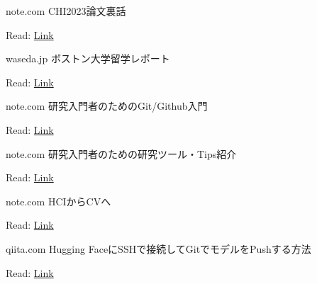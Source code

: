 
\begin{cventries}

  \cventry
    {note.com}
    {{\jpfont CHI2023論文裏話}}
    {}
    {}
    {
      \begin{cvitems}
        \item {Read: \href{https://note.com/chestnutforest/n/n03441edf8ad0}{Link}}
      \end{cvitems}
    }

  \cventry
    {waseda.jp}
    {{\jpfont ボストン大学留学レポート}}
    {}
    {}
    {
      \begin{cvitems}
        \item {Read: \href{https://www.waseda.jp/fsci/ict-robotics/study-abroad/4716}{Link}}
      \end{cvitems}
    }

  \cventry
    {note.com}
    {{\jpfont 研究入門者のためのGit/Github入門}}
    {}
    {}
    {
      \begin{cvitems}
        \item {Read: \href{https://note.com/chestnutforest/n/n2434abb8d009}{Link}}
      \end{cvitems}
    }

  \cventry
    {note.com}
    {{\jpfont 研究入門者のための研究ツール・Tips紹介}}
    {}
    {}
    {
      \begin{cvitems}
        \item {Read: \href{https://note.com/chestnutforest/n/n3ad54b1aa5f8}{Link}}
      \end{cvitems}
    }

  \cventry
    {note.com}
    {{\jpfont HCIからCVへ}}
    {}
    {}
    {
      \begin{cvitems}
        \item {Read: \href{https://note.com/chestnutforest/n/nafb01d21a878}{Link}}
      \end{cvitems}
    }

  \cventry
    {qiita.com}
    {{\jpfont Hugging FaceにSSHで接続してGitでモデルをPushする方法}}
    {}
    {}
    {
      \begin{cvitems}
        \item {Read: \href{https://qiita.com/chestnutforestlabo/items/cf1b4eb94ab68ed56f25}{Link}}
      \end{cvitems}
    }


\end{cventries}
